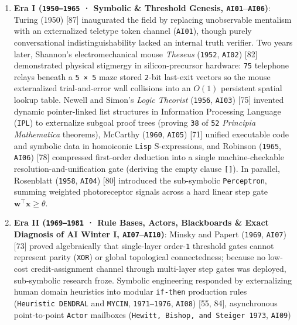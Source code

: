 \documentclass[10pt,letterpaper]{article}
\providecommand{\tightlist}{\setlength{\itemsep}{1pt}\setlength{\parskip}{0pt}}
\begin{document}
\begin{enumerate}
\def\labelenumi{\arabic{enumi}.}
\tightlist
\item
  \textbf{Era I (\texttt{1950–1965} · Symbolic \& Threshold Genesis,
  \texttt{AI01}--\texttt{AI06})}: Turing (1950) {[}87{]} inaugurated the
  field by replacing unobservable mentalism with an externalized
  teletype token channel (\texttt{AI01}), though purely conversational
  indistinguishability lacked an internal truth verifier. Two years
  later, Shannon's electromechanical mouse \emph{Theseus}
  (\texttt{1952}, \texttt{AI02}) {[}82{]} demonstrated physical
  stigmergy in silicon-precursor hardware: \texttt{75} telephone relays
  beneath a \texttt{5\ ×\ 5} maze stored \texttt{2}-bit last-exit
  vectors so the mouse externalized trial-and-error wall collisions into
  an \(O(1)\) persistent spatial lookup table. Newell and Simon's
  \emph{Logic Theorist} (\texttt{1956}, \texttt{AI03}) {[}75{]} invented
  dynamic pointer-linked list structures in Information Processing
  Language (\texttt{IPL}) to externalize subgoal proof trees (proving
  \texttt{38} of \texttt{52} \emph{Principia Mathematica} theorems),
  McCarthy (\texttt{1960}, \texttt{AI05}) {[}71{]} unified executable
  code and symbolic data in homoiconic \texttt{Lisp} S-expressions, and
  Robinson (\texttt{1965}, \texttt{AI06}) {[}78{]} compressed
  first-order deduction into a single machine-checkable
  resolution-and-unification gate (deriving the empty clause
  \texttt{{[}{]}}). In parallel, Rosenblatt (\texttt{1958},
  \texttt{AI04}) {[}80{]} introduced the sub-symbolic
  \texttt{Perceptron}, summing weighted photoreceptor signals across a
  hard linear step gate \(\mathbf{w}^\top \mathbf{x} \ge \theta\).
\item
  \textbf{Era II (\texttt{1969–1981} · Rule Bases, Actors, Blackboards
  \& Exact Diagnosis of AI Winter I, \texttt{AI07}--\texttt{AI10})}:
  Minsky and Papert (\texttt{1969}, \texttt{AI07}) {[}73{]} proved
  algebraically that single-layer order-\texttt{1} threshold gates
  cannot represent parity (\texttt{XOR}) or global topological
  connectedness; because no low-cost credit-assignment channel through
  multi-layer step gates was deployed, sub-symbolic research froze.
  Symbolic engineering responded by externalizing human domain
  heuristics into modular \texttt{if-then} production rules
  (\texttt{Heuristic\ DENDRAL} and \texttt{MYCIN}, \texttt{1971–1976},
  \texttt{AI08}) {[}55, 84{]}, asynchronous point-to-point
  \texttt{Actor} mailboxes
  (\texttt{Hewitt,\allowbreak{}\ Bishop,\allowbreak{}\ and\ Steiger\ 1973}, \texttt{AI09})

\end{enumerate}
\end{document}
